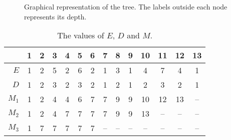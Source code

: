 \begin{enumerate}
\begin{figure}[t]
    \caption{Graphical representation of the tree. The labels outside each node
    represents its depth.}

    \label{fig:tree-depths-0}
  \end{figure}
  \begin{table}
    \centering
    \begin{tabular}{|r||c|c|c|c|c|c|c|c|c|c|c|c|c|}
      \multicolumn{1}{c}{} & \multicolumn{1}{c}{\tiny 1} &
      \multicolumn{1}{c}{\tiny 2} & \multicolumn{1}{c}{\tiny 3} &
      \multicolumn{1}{c}{\tiny 4} & \multicolumn{1}{c}{\tiny 5} &
      \multicolumn{1}{c}{\tiny 6} & \multicolumn{1}{c}{\tiny 7} &
      \multicolumn{1}{c}{\tiny 8} & \multicolumn{1}{c}{\tiny 9} &
      \multicolumn{1}{c}{\tiny 10} & \multicolumn{1}{c}{\tiny 11} &
      \multicolumn{1}{c}{\tiny 12} & \multicolumn{1}{c}{\tiny 13} \\
      \hline
      $E$ & 1 & 2 & 5 & 2 & 6 & 2 & 1 & 3 & 1 & 4 & 7 & 4 & 1 \\\hline
      $D$ & 1 & 2 & 3 & 2 & 3 & 2 & 1 & 2 & 1 & 2 & 3 & 2 & 1 \\\hline\hline
      $M_1$ & 1 & 2 & 4 & 4 & 6 & 7 & 7 & 9 & 9 & 10 & 12 & 13 & -- \\
      $M_2$ & 1 & 2 & 4 & 7 & 7 & 7 & 7 & 9 & 9 & 13 & -- & -- & -- \\
      $M_3$ & 1 & 7 & 7 & 7 & 7 & 7 & -- & -- & -- & -- & -- & -- & -- \\
      \hline
    \end{tabular}

    \caption{The values of $E$, $D$ and $M$.}
    \label{tab:sparse-matrix}
  \end{table}

\end{enumerate}
